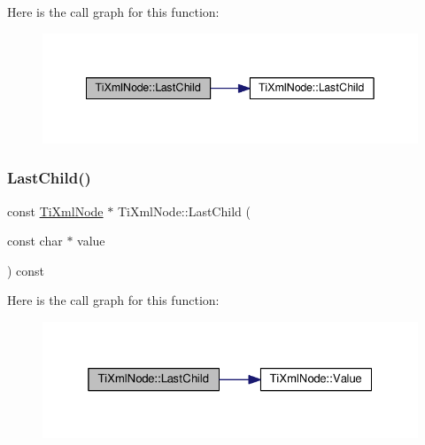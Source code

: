 Here is the call graph for this function\+:
\nopagebreak
\begin{figure}[H]
\begin{center}
\leavevmode
\includegraphics[width=342pt]{class_ti_xml_node_a6432d2b2495f6caf9cb4278df706a031_cgraph}
\end{center}
\end{figure}
\mbox{\label{class_ti_xml_node_afdd7b6ba456fdd570610c1d841f91eb3}} 
\subsubsection{\texorpdfstring{Last\+Child()}{LastChild()}\hspace{0.1cm}{\footnotesize\ttfamily [3/4]}}
{\footnotesize\ttfamily const \hyperlink{class_ti_xml_node}{Ti\+Xml\+Node} $\ast$ Ti\+Xml\+Node\+::\+Last\+Child (\begin{DoxyParamCaption}\item[{const char $\ast$}]{value }\end{DoxyParamCaption}) const}

Here is the call graph for this function\+:
\nopagebreak
\begin{figure}[H]
\begin{center}
\leavevmode
\includegraphics[width=325pt]{class_ti_xml_node_afdd7b6ba456fdd570610c1d841f91eb3_cgraph}
\end{center}
\end{figure}
\mbox{\label{class_ti_xml_node_abad5bf1059c48127b958711ef89e8e5d}} 
